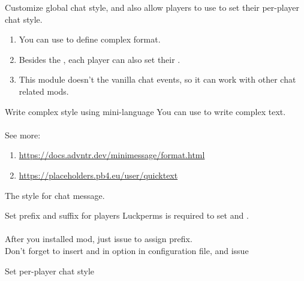 Customize global chat style, and also allow players to use  to set their per-player chat style.

\begin{enumerate}
    \item You can use  to define complex format.
    \item Besides the , each player can also set their .
    \item This module doesn't  the vanilla chat events, so it can work with other chat related mods.
\end{enumerate}

\begin{tips}{Write complex style using mini-language}
    You can use  to write complex text.\\
    \\
    See more:
    \begin{enumerate}
        \item \url{https://docs.advntr.dev/minimessage/format.html}
        \item \url{https://placeholders.pb4.eu/user/quicktext}
    \end{enumerate}
\end{tips}

\begin{Configuration}

    \item[style]{
        The style for chat message.
    }

\end{Configuration}


\begin{example}{Set prefix and suffix for players}
    Luckperms is required to set  and . \\
    \\
    After you installed  mod, just issue  to assign prefix. \\
    Don't forget to insert  and  in  option in configuration file, and issue 
\end{example}

\begin{example}{Set per-player chat style}
\end{example}

